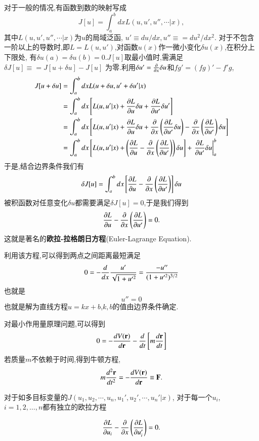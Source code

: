对于一般的情况,有函数到数的映射写成
\begin{equation}
  J[u] = \int_{a}^{b}  dx L(u, u', u'', \cdots| x), 
\end{equation}
其中$L(u, u', u'',\cdots | x)$为$u$的局域泛函, $u' \equiv du/dx, u'' \equiv = du^2/dx^2$.
对于不包含一阶以上的导数时,即$L = L(u,u')$,对函数$u(x)$作一微小变化$\delta u(x)$,在积分上下限处,
有$\delta u(a) = \delta u(b) = 0$.$J[u]$取最小值时,需满足$\delta J[u] \equiv = J[u + \delta u] - J[u]$
为零.利用$\delta u' = \frac{\partial{}}{\partial{x}} \delta u$和$fg' = (fg)' - f'g$,
\begin{align}
  J[u + \delta u] &= \int_{a}^{b}  dx L(u + \delta u, u' + \delta u'| x) 
    \nonumber \\ 
    &= \int_{a}^{b} dx \left[ L(u, u'| x) + \funcpd{L}{u} \delta u + \funcpd{L}{u'} \delta u' \right]  
    \nonumber \\ 
    &= \int_{a}^{b} dx \left[ L(u, u'| x) + \funcpd{L}{u} \delta u + \funcpd{}{x}\left( \funcpd{L}{u'} \delta u \right)
    -  \funcpd{}{x}\left( \funcpd{L}{u'} \right) \delta u  \right]  
    \nonumber \\ 
    &= \int_{a}^{b} dx \left[ L(u, u'| x) + \left( \funcpd{L}{u} -  \funcpd{}{x}\left( \funcpd{L}{u'} \right)   \right) \delta u \right]  
        + \left. \funcpd{L}{u'} \delta u \right|_{a}^{b} 
     \nonumber %
\end{align}
于是,结合边界条件我们有
\begin{align}
  \delta J[u] = \int_{a}^{b} dx \left[ \frac{\partial{L}}{\partial{u}} -  \frac{\partial{}}{\partial{x}}\left( \frac{\partial{L}}{\partial{u'}} \right)   \right] \delta u 
\end{align}
被积函数对任意变化$\delta u$都需要满足$\delta J[u] = 0$,于是我们得到
\begin{equation}
  \frac{\partial{L}}{\partial{u}} -  \frac{\partial{}}{\partial{x}}\left( \frac{\partial{L}}{\partial{u'}} \right) = 0 .
\end{equation}
这就是著名的\textbf{欧拉-拉格朗日方程}(Euler-Lagrange Equation).

利用该方程,可以得到两点之间距离最短满足
\[
  0 = - \frac{d{}}{d{x}} \frac{u'}{\sqrt{1 + u'^2}} = \frac{-u''}{(1+ u'^2)^{3/2}}
\]
也就是
\[ u'' = 0\]
也就是解为直线方程$ u = k x + b$,$k,b$的值由边界条件确定.

对最小作用量原理问题,可以得到
\[
  0 = - \frac{d{V({\mathbf{r}})}}{d{{\mathbf{r}}}} - \frac{d{}}{d{t}} \left[ m \frac{d{\mathbf{r}}}{dt} \right]
\]
若质量$m$不依赖于时间,得到牛顿方程,
\[
  m \frac{d^2{\mathbf{r}}}{dt^2} = - \frac{d{V({\mathbf{r}})}}{d{{\mathbf{r}}}} \equiv {\mathbf{F}} .
\]

对于如多目标变量的$J(u_1, u_2, \cdots, u_n, u_1', u_2', \cdots, u_n'|x)$, 对于每一个$u_i$, $i=1,2,\dots,n$都有独立的欧拉方程

\begin{equation}
  \frac{\partial{L}}{\partial{u_i}} -  \frac{\partial{}}{\partial{x}}\left( \frac{\partial{L}}{\partial{u'_i}} \right) = 0 .
\end{equation}





